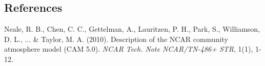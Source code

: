 \documentclass[a4paper,11pt]{article}
\begin{document}
\subsection*{References}

Neale, R. B., Chen, C. C., Gettelman, A., Lauritzen, P. H., Park, S., Williamson, D. L., ... \& Taylor, M. A. (2010). Description of the NCAR community atmosphere model (CAM 5.0). \textit{NCAR Tech. Note NCAR/TN-486+ STR}, 1(1), 1-12.
\end{document}
